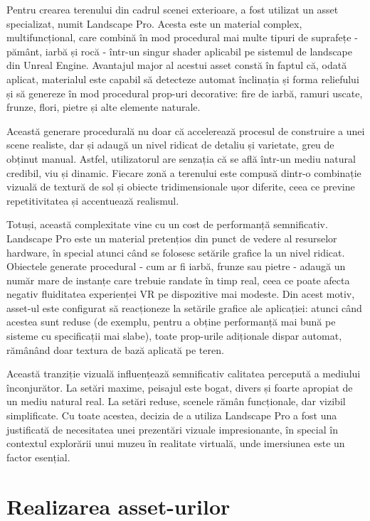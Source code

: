 Pentru crearea terenului din cadrul scenei exterioare, a fost utilizat un asset specializat, numit Landscape Pro\cite{assets:fabmarketplace}. Acesta este un material complex, multifuncțional, care combină în mod procedural mai multe tipuri de suprafețe - pământ, iarbă și rocă - într-un singur shader aplicabil pe sistemul de landscape din Unreal Engine. Avantajul major al acestui asset constă în faptul că, odată aplicat, materialul este capabil să detecteze automat înclinația și forma reliefului și să genereze în mod procedural prop-uri decorative: fire de iarbă, ramuri uscate, frunze, flori, pietre și alte elemente naturale.

Această generare procedurală nu doar că accelerează procesul de construire a unei scene realiste, dar și adaugă un nivel ridicat de detaliu și varietate, greu de obținut manual. Astfel, utilizatorul are senzația că se află într-un mediu natural credibil, viu și dinamic. Fiecare zonă a terenului este compusă dintr-o combinație vizuală de textură de sol și obiecte tridimensionale ușor diferite, ceea ce previne repetitivitatea și accentuează realismul.

Totuși, această complexitate vine cu un cost de performanță semnificativ. Landscape Pro este un material pretențios din punct de vedere al resurselor hardware, în special atunci când se folosesc setările grafice la un nivel ridicat. Obiectele generate procedural - cum ar fi iarbă, frunze sau pietre - adaugă un număr mare de instanțe care trebuie randate în timp real, ceea ce poate afecta negativ fluiditatea experienței VR pe dispozitive mai modeste. Din acest motiv, asset-ul este configurat să reacționeze la setările grafice ale aplicației: atunci când acestea sunt reduse (de exemplu, pentru a obține performanță mai bună pe sisteme cu specificații mai slabe), toate prop-urile adiționale dispar automat, rămânând doar textura de bază aplicată pe teren.

Această tranziție vizuală influențează semnificativ calitatea percepută a mediului înconjurător. La setări maxime, peisajul este bogat, divers și foarte apropiat de un mediu natural real. La setări reduse, scenele rămân funcționale, dar vizibil simplificate. Cu toate acestea, decizia de a utiliza Landscape Pro a fost una justificată de necesitatea unei prezentări vizuale impresionante, în special în contextul explorării unui muzeu în realitate virtuală, unde imersiunea este un factor esențial.

\section{Realizarea asset-urilor}

